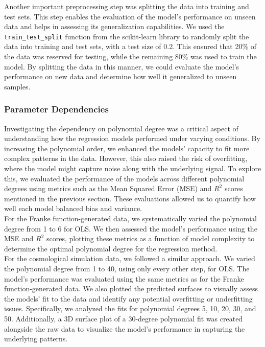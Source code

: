 \documentclass[aps,pra,english,notitlepage,reprint,nofootinbib]{revtex4-1}  %
\begin{document}
Another important preprocessing step was splitting the data into training and test sets. This step enables the evaluation of the model's performance on unseen data and helps in assessing its generalization capabilities. We used the \verb|train_test_split| function from the scikit-learn library to randomly split the data into training and test sets, with a test size of 0.2. This ensured that 20\% of the data was reserved for testing, while the remaining 80\% was used to train the model. By splitting the data in this manner, we could evaluate the model's performance on new data and determine how well it generalized to unseen samples.

\subsubsection{Parameter Dependencies}
Investigating the dependency on polynomial degree was a critical aspect of understanding how the regression models performed under varying conditions. By increasing the polynomial order, we enhanced the models' capacity to fit more complex patterns in the data. However, this also raised the risk of overfitting, where the model might capture noise along with the underlying signal. To explore this, we evaluated the performance of the models across different polynomial degrees using metrics such as the Mean Squared Error (MSE) and $R^2$ scores mentioned in the previous section. These evaluations allowed us to quantify how well each model balanced bias and variance. \\

For the Franke function-generated data, we systematically varied the polynomial degree from 1 to 6 for OLS. We then assessed the model's performance using the MSE and $R^2$ scores, plotting these metrics as a function of model complexity to determine the optimal polynomial degree for the regression method.\\

For the cosmological simulation data, we followed a similar approach. We varied the polynomial degree from 1 to 40, using only every other step, for OLS. The model's performance was evaluated using the same metrics as for the Franke function-generated data. We also plotted the predicted surfaces to visually assess the models' fit to the data and identify any potential overfitting or underfitting issues. Specifically, we analyzed the fits for polynomial degrees 5, 10, 20, 30, and 50. Additionally, a 3D surface plot of a 30-degree polynomial fit was created alongside the raw data to visualize the model's performance in capturing the underlying patterns.\\
\end{document}
